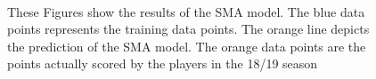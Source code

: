 \documentclass[a4paper,11pt,twoside]{article}
\begin{document}
\begin{figure}
\captionsetup{justification=centering}
\\
\caption{These Figures show the results of the SMA model. The blue data points represents the training data points. The orange line depicts the prediction of the SMA model. The orange data points are the points actually scored by the players in the 18/19 season}
\end{figure}
\end{document}
